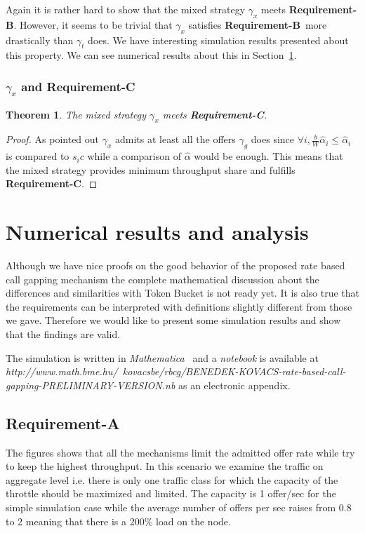 \documentclass[conference]{IEEEtran}
\newtheorem{theorem}{Theorem}
\newcommand{\comment}[1]{}
\newcommand{\reqA}{\textbf{Requirement-A}}
\newcommand{\reqB}{\textbf{Requirement-B}}
\newcommand{\reqC}{\textbf{Requirement-C}}
\begin{document}
Again it is rather hard to show that the mixed strategy $\gamma_x$
meets \reqB. However, it seems to be trivial that $\gamma_x$
satisfies \reqB\ more drastically than $\gamma_t$ does. We have
interesting simulation results presented about this property. We can
see numerical results about this in
Section~\ref{section:numerical-results}.

\subsubsection{$\gamma_x$ and Requirement-C}
\begin{theorem}
The mixed strategy $\gamma_x$ meets \reqC.
\end{theorem}

\begin{proof} As pointed out $\gamma_x$ admits at least all the offers
$\gamma_g$ does since $\forall i,
\frac{b}{W}\hat{\alpha}_i\leq\hat{\alpha}_i$ is compared to $s_i c$
while a comparison of $\hat{\alpha}$ would be enough. This means
that the mixed strategy provides minimum throughput share and
fulfills \reqC.
\end{proof}

\section{Numerical results and
analysis}\label{section:numerical-results}
Although we have nice proofs on the good behavior of the proposed
rate based call gapping mechanism the complete mathematical
discussion about the differences and similarities with Token Bucket
is not ready yet. It is also true that the requirements can be
interpreted with definitions slightly different from those we gave.
Therefore we would like to present some simulation results and show
that the findings are valid.

The simulation is written in \textit{Mathematica}~\cite{MATHEMATICA}
and a \textit{notebook} is available at
\textit{http://www.math.bme.hu/~kovacsbe/rbcg/BENEDEK-KOVACS-rate-based-call-gapping-PRELIMINARY-VERSION.nb}
as an electronic appendix. \comment{One can also download
demonstrations from the internet page of \textit{Wolfram Inc.}.}


\subsection{\reqA}
The figures shows that all the mechanisms limit the admitted offer
rate while try to keep the highest throughput. In this scenario we
examine the traffic on aggregate level i.e. there is only one
traffic class for which the capacity of the throttle should be
maximized and limited. The capacity is 1 offer/sec for the simple
simulation case while the average number of offers per sec raises
from 0.8 to 2 meaning that there is a 200\% load on the node.
\end{document}
